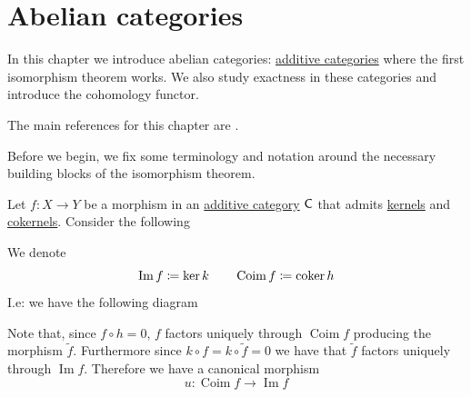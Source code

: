 \documentclass[../../main]{subfiles}
\begin{document}
\chapter{Abelian categories}

In this chapter we introduce abelian categories: \hyperref[def:additive-category]{additive categories} where the first isomorphism theorem works.
We also study exactness in these categories and introduce the cohomology functor.

The main references for this chapter are \cite{weibelIntroductionHomologicalAlgebra1994, gelfandMethodsHomologicalAlgebra2003, aluffiAlgebraChapter02009}.

Before we begin, we fix some terminology and notation around the necessary building blocks of the isomorphism theorem.
\begin{definition}
  Let \(f\colon X \to Y\) be a morphism in an \hyperref[def:additive-category]{additive category} \(\mathsf{C}\) that admits \hyperref[def:categorical-kernel]{kernels} and \hyperref[def:categorical-cokernel]{cokernels}.
  Consider the following
  \begin{center}
  \end{center}
  We denote
  \begin{equation*}
    \operatorname{Im} f \coloneq \ker k \qquad \operatorname{Coim} f \coloneq \operatorname*{coker} h
  \end{equation*}
  I.e: we have the following diagram
  \begin{center}
  \end{center}
  Note that, since \(f \circ h = 0\), \(f\) factors uniquely through \(\operatorname{Coim} f\) producing the morphism \(\widetilde{f}\).
  Furthermore since \(k \circ f = k \circ \widetilde{f} = 0\) we have that \(\widetilde{f}\) factors uniquely through \(\operatorname{Im} f\).
  Therefore we have a canonical morphism
  \begin{equation*}
    u\colon \operatorname{Coim} f \to \operatorname{Im} f
  \end{equation*}
\end{definition}
\end{document}
